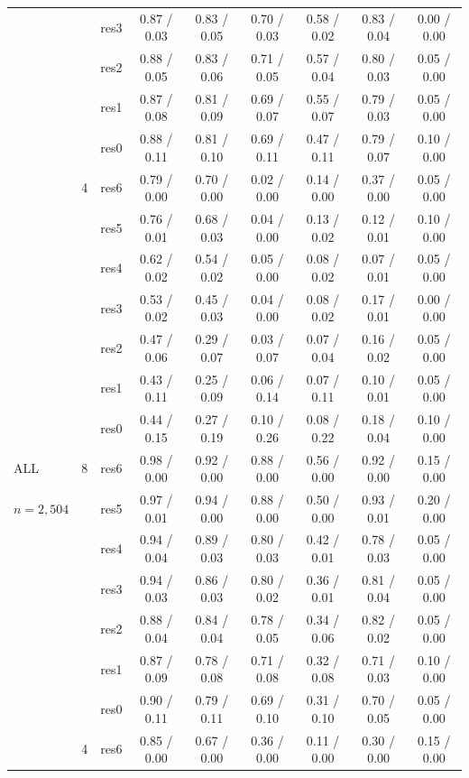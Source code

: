 \begin{tabular}{lllcccccc}
 &  & res3 & 0.87 / 0.03 & 0.83 / 0.05 & 0.70 / 0.03 & 0.58 / 0.02 & 0.83 / 0.04 & 0.00 / 0.00\\
 &  & res2 & 0.88 / 0.05 & 0.83 / 0.06 & 0.71 / 0.05 & 0.57 / 0.04 & 0.80 / 0.03 & 0.05 / 0.00\\
 &  & res1 & 0.87 / 0.08 & 0.81 / 0.09 & 0.69 / 0.07 & 0.55 / 0.07 & 0.79 / 0.03 & 0.05 / 0.00\\
 &  & res0 & 0.88 / 0.11 & 0.81 / 0.10 & 0.69 / 0.11 & 0.47 / 0.11 & 0.79 / 0.07 & 0.10 / 0.00\\
\midrule
 & 4 & res6 & 0.79 / 0.00 & 0.70 / 0.00 & 0.02 / 0.00 & 0.14 / 0.00 & 0.37 / 0.00 & 0.05 / 0.00\\
 &  & res5 & 0.76 / 0.01 & 0.68 / 0.03 & 0.04 / 0.00 & 0.13 / 0.02 & 0.12 / 0.01 & 0.10 / 0.00\\
 &  & res4 & 0.62 / 0.02 & 0.54 / 0.02 & 0.05 / 0.00 & 0.08 / 0.02 & 0.07 / 0.01 & 0.05 / 0.00\\
 &  & res3 & 0.53 / 0.02 & 0.45 / 0.03 & 0.04 / 0.00 & 0.08 / 0.02 & 0.17 / 0.01 & 0.00 / 0.00\\
 &  & res2 & 0.47 / 0.06 & 0.29 / 0.07 & 0.03 / 0.07 & 0.07 / 0.04 & 0.16 / 0.02 & 0.05 / 0.00\\
 &  & res1 & 0.43 / 0.11 & 0.25 / 0.09 & 0.06 / 0.14 & 0.07 / 0.11 & 0.10 / 0.01 & 0.05 / 0.00\\
 &  & res0 & 0.44 / 0.15 & 0.27 / 0.19 & 0.10 / 0.26 & 0.08 / 0.22 & 0.18 / 0.04 & 0.10 / 0.00\\
\midrule
ALL & 8 & res6 & 0.98 / 0.00 & 0.92 / 0.00 & 0.88 / 0.00 & 0.56 / 0.00 & 0.92 / 0.00 & 0.15 / 0.00\\
$n=2{,}504$ &  & res5 & 0.97 / 0.01 & 0.94 / 0.00 & 0.88 / 0.00 & 0.50 / 0.00 & 0.93 / 0.01 & 0.20 / 0.00\\
 &  & res4 & 0.94 / 0.04 & 0.89 / 0.03 & 0.80 / 0.03 & 0.42 / 0.01 & 0.78 / 0.03 & 0.05 / 0.00\\
 &  & res3 & 0.94 / 0.03 & 0.86 / 0.03 & 0.80 / 0.02 & 0.36 / 0.01 & 0.81 / 0.04 & 0.05 / 0.00\\
 &  & res2 & 0.88 / 0.04 & 0.84 / 0.04 & 0.78 / 0.05 & 0.34 / 0.06 & 0.82 / 0.02 & 0.05 / 0.00\\
 &  & res1 & 0.87 / 0.09 & 0.78 / 0.08 & 0.71 / 0.08 & 0.32 / 0.08 & 0.71 / 0.03 & 0.10 / 0.00\\
 &  & res0 & 0.90 / 0.11 & 0.79 / 0.11 & 0.69 / 0.10 & 0.31 / 0.10 & 0.70 / 0.05 & 0.05 / 0.00\\
\midrule
 & 4 & res6 & 0.85 / 0.00 & 0.67 / 0.00 & 0.36 / 0.00 & 0.11 / 0.00 & 0.30 / 0.00 & 0.15 / 0.00\\

\end{tabular}
